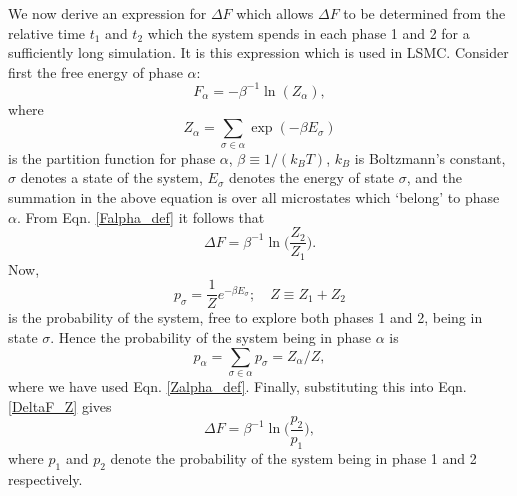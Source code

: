 \documentclass{report}
\begin{document}
We now derive an expression for $\Delta F$ which allows $\Delta F$ to be determined from the relative time $t_1$ and $t_2$ which the system spends 
in each phase 1 and 2 for a sufficiently long simulation. It is this expression which is used in LSMC. Consider first the free energy of phase $\alpha$:
\begin{equation}\label{Falpha_def}
F_{\alpha}=-\beta^{-1}\ln(Z_{\alpha}),
\end{equation}
where
\begin{equation}\label{Zalpha_def}
Z_{\alpha}=\sum_{\sigma\in\alpha}\exp(-\beta E_{\sigma})
\end{equation}
is the partition function for phase $\alpha$, $\beta\equiv 1/(k_BT)$, $k_B$ is Boltzmann's constant, $\sigma$ denotes a state of the system, $E_{\sigma}$ 
denotes the energy of state $\sigma$, and the summation in the above equation is over all microstates which `belong' to phase $\alpha$. 
From Eqn. \eqref{Falpha_def} it follows that
\begin{equation}\label{DeltaF_Z}
\Delta F=\beta^{-1}\ln\biggl(\frac{Z_2}{Z_1}\biggr).
\end{equation}
Now,
\begin{equation}\label{MC_prob}
p_{\sigma}=\frac{1}{Z}e^{-\beta E_{\sigma}}; \quad Z\equiv Z_1+Z_2
\end{equation}
is the probability of the system, free to explore both phases 1 and 2, being in state $\sigma$. Hence the probability of the system being in
phase $\alpha$ is
\begin{equation}
p_{\alpha} = \sum_{\sigma\in \alpha}p_{\sigma} = Z_{\alpha}/Z,
\end{equation}
where we have used Eqn. \eqref{Zalpha_def}. Finally, substituting this into Eqn. \eqref{DeltaF_Z} gives
\begin{equation}\label{DeltaF_stat_mech}
\Delta F=\beta^{-1}\ln\biggl(\frac{p_2}{p_1}\biggr),
\end{equation}
where $p_1$ and $p_2$ denote the probability of the system being in phase 1 and 2 respectively.  
\end{document}
